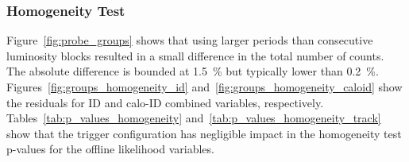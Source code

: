 \subsubsection{Homogeneity Test}%
\label{top:homogeneity_extra}

Figure~\ref{fig:probe_groups} shows that using larger periods than consecutive
luminosity blocks resulted in a small difference in the total number of counts.
The absolute difference is bounded at \SI{1.5}{\%} but typically lower than
\SI{0.2}{\%}. Figures~\ref{fig:groups_homogeneity_id}
and~\ref{fig:groups_homogeneity_caloid} show the residuals for ID and calo-ID
combined variables, respectively. Tables~\ref{tab:p_values_homogeneity}
and~\ref{tab:p_values_homogeneity_track} show that the trigger configuration has
negligible impact in the homogeneity test p-values for the offline likelihood
variables.

